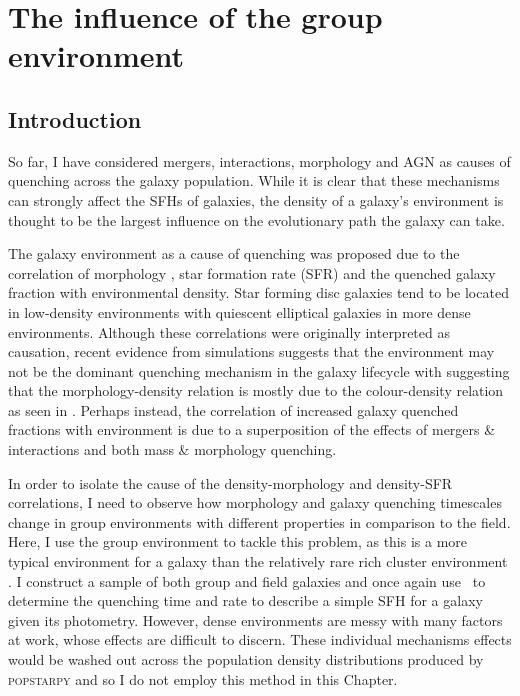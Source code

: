 \chapter{The influence of the group environment}\label{chap:env}

\section{Introduction}\label{sec:intro}
 
 So far, I have considered mergers, interactions, morphology and AGN as causes of quenching across the galaxy population. While it is clear that these mechanisms can strongly affect the SFHs of galaxies, the density of a galaxy's environment is thought to be the largest influence on the evolutionary path the galaxy can take. 
 
 The galaxy environment as a cause of quenching was proposed due to the correlation of morphology \citep{dressler80, smail97, poggianti99, postman05, Bamford09}, star formation rate (SFR) and the quenched galaxy fraction \citep{kauffmann03, Baldry06, peng12, darvish16} with environmental density. Star forming disc galaxies tend to be located in low-density environments with quiescent elliptical galaxies in more dense environments. Although these correlations were originally interpreted as causation, recent evidence from simulations suggests that the environment may not be the dominant quenching mechanism in the galaxy lifecycle \citep{ref, ref} with \citet{Skibba09} suggesting that the morphology-density relation is mostly due to the colour-density relation as seen in \citet{pimbblet02}. Perhaps instead, the correlation of increased galaxy quenched fractions with environment is due to a superposition of the effects of mergers \& interactions and both mass \& morphology quenching. 
  
In order to isolate the cause of the density-morphology and density-SFR correlations, I need to observe how morphology and galaxy quenching timescales change in group environments with different properties in comparison to the field. Here, I use the group environment to tackle this problem, as this is a more typical environment for a galaxy than the relatively rare rich cluster environment \citep{carlberg04}. I construct a sample of both group and field galaxies and once again use \starpy\ to determine the quenching time and rate to describe a simple SFH for a galaxy given its photometry. However, dense environments are messy with many factors at work, whose effects are difficult to discern. These individual mechanisms effects would be washed out across the population density distributions produced by \textsc{popstarpy} and so I do not employ this method in this Chapter. 

